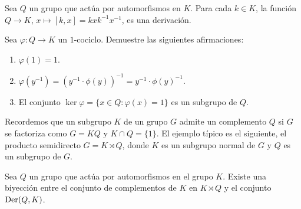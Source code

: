 \begin{example}
	Sea $Q$ un grupo que actúa por automorfismos en $K$. Para cada $k\in K$, la
	función $Q\to K$, $x\mapsto [k,x]=kxk^{-1}x^{-1}$, es una derivación.
\end{example}


\begin{exercise}
	\label{exercise:1cocycle}
	Sea $\varphi\colon Q\to K$ un $1$-cociclo. Demuestre las siguientes afirmaciones:
	\begin{enumerate}
		\item $\varphi(1)=1$.
		\item $\varphi(y^{-1})=(y^{-1}\cdot\phi(y))^{-1}=y^{-1}\cdot\phi(y)^{-1}$.
		\item El conjunto $\ker\varphi=\{x\in Q:\varphi(x)=1\}$ 	es un
			subgrupo de $Q$. 
	\end{enumerate}
\end{exercise}

	

Recordemos que un subgrupo $K$ de un grupo $G$ admite un complemento $Q$ si 
$G$ se factoriza como 
$G=KQ$ y $K\cap Q=\{1\}$. 
El ejemplo típico es el siguiente, el producto semidirecto $G=K\rtimes Q$, donde $K$ es un subgrupo
normal de $G$ y $Q$ es un subgrupo de $G$. 

\begin{theorem}
	\label{theorem:complementos}
	Sea $Q$ un grupo que actúa por automorfismos en el grupo $K$.  Existe una
	biyección entre el conjunto de complementos de $K$ en $K\rtimes Q$ y el
	conjunto $\operatorname{Der}(Q,K)$.
\end{theorem}

